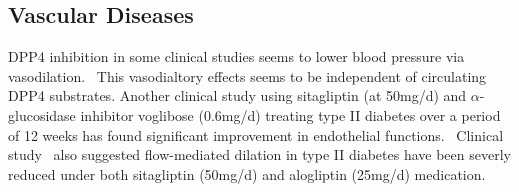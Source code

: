 \subsection{Vascular Diseases}
DPP4 inhibition in some clinical studies seems to lower blood pressure via vasodilation.~\cite{Kröller-Schön2012} This vasodialtory effects seems to be independent of circulating DPP4 substrates. Another clinical study using sitagliptin (at 50mg/d) and $\alpha$-glucosidase inhibitor voglibose (0.6mg/d) treating type II diabetes over a period of 12 weeks has found significant improvement in endothelial functions.~\cite{Nakamura2014} Clinical study~\cite{Ayaori2013} also suggested flow-mediated dilation in type II diabetes have been severly reduced under both sitagliptin (50mg/d) and alogliptin (25mg/d) medication. 